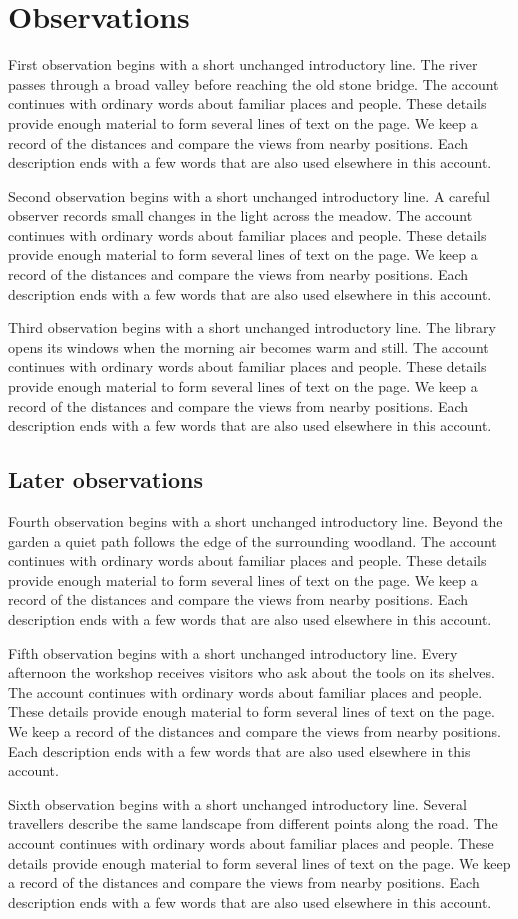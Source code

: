 \documentclass[11pt,oneside]{book}
\begin{document}
\chapter{Observations}
First observation begins with a short unchanged introductory line.
The river passes through a broad valley before reaching the old stone bridge.
The account continues with ordinary words about familiar places and people.
These details provide enough material to form several lines of text on the page.
We keep a record of the distances and compare the views from nearby positions.
Each description ends with a few words that are also used elsewhere in this account.

Second observation begins with a short unchanged introductory line.
A careful observer records small changes in the light across the meadow.
The account continues with ordinary words about familiar places and people.
These details provide enough material to form several lines of text on the page.
We keep a record of the distances and compare the views from nearby positions.
Each description ends with a few words that are also used elsewhere in this account.

Third observation begins with a short unchanged introductory line.
The library opens its windows when the morning air becomes warm and still.
The account continues with ordinary words about familiar places and people.
These details provide enough material to form several lines of text on the page.
We keep a record of the distances and compare the views from nearby positions.
Each description ends with a few words that are also used elsewhere in this account.

\newpage
\section{Later observations}
Fourth observation begins with a short unchanged introductory line.
Beyond the garden a quiet path follows the edge of the surrounding woodland.
The account continues with ordinary words about familiar places and people.
These details provide enough material to form several lines of text on the page.
We keep a record of the distances and compare the views from nearby positions.
Each description ends with a few words that are also used elsewhere in this account.

Fifth observation begins with a short unchanged introductory line.
Every afternoon the workshop receives visitors who ask about the tools on its shelves.
The account continues with ordinary words about familiar places and people.
These details provide enough material to form several lines of text on the page.
We keep a record of the distances and compare the views from nearby positions.
Each description ends with a few words that are also used elsewhere in this account.

Sixth observation begins with a short unchanged introductory line.
Several travellers describe the same landscape from different points along the road.
The account continues with ordinary words about familiar places and people.
These details provide enough material to form several lines of text on the page.
We keep a record of the distances and compare the views from nearby positions.
Each description ends with a few words that are also used elsewhere in this account.
\end{document}
